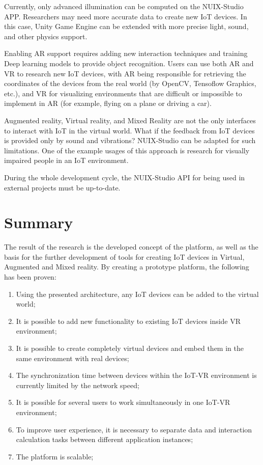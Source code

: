 Currently, only advanced illumination can be computed on the NUIX-Studio APP. Researchers may need more accurate data to create new IoT devices. In this case, Unity Game Engine can be extended with more precise light, sound, and other physics support.

Enabling AR support requires adding new interaction techniques and training Deep learning models to provide object recognition. Users can use both AR and VR to research new IoT devices, with AR being responsible for retrieving the coordinates of the devices from the real world (by OpenCV, Tensoflow Graphics, etc.), and VR for visualizing environments that are difficult or impossible to implement in AR (for example, flying on a plane or driving a car).

Augmented reality, Virtual reality, and Mixed Reality are not the only interfaces to interact with IoT in the virtual world. What if the feedback from IoT devices is provided only by sound and vibrations? NUIX-Studio can be adapted for such limitations. One of the example usages of this approach is research for visually impaired people in an IoT environment.

During the whole development cycle, the NUIX-Studio API for being used in external projects must be up-to-date. 

\section{Summary}

The result of the research is the developed concept of the platform, as well as the basis for the further development of tools for creating IoT devices in Virtual, Augmented and Mixed reality. By creating a prototype platform, the following has been proven:
\begin{enumerate}
    \item Using the presented architecture, any IoT devices can be added to the virtual world;
    \item It is possible to add new functionality to existing IoT devices inside VR environment;
    \item It is possible to create completely virtual devices and embed them in the same environment with real devices;
    \item The synchronization time between devices within the IoT-VR environment is currently limited by the network speed;
    \item It is possible for several users to work simultaneously in one IoT-VR environment;
    \item To improve user experience, it is necessary to separate data and interaction calculation tasks between different application instances;
    \item The platform is scalable;
\end{enumerate}


